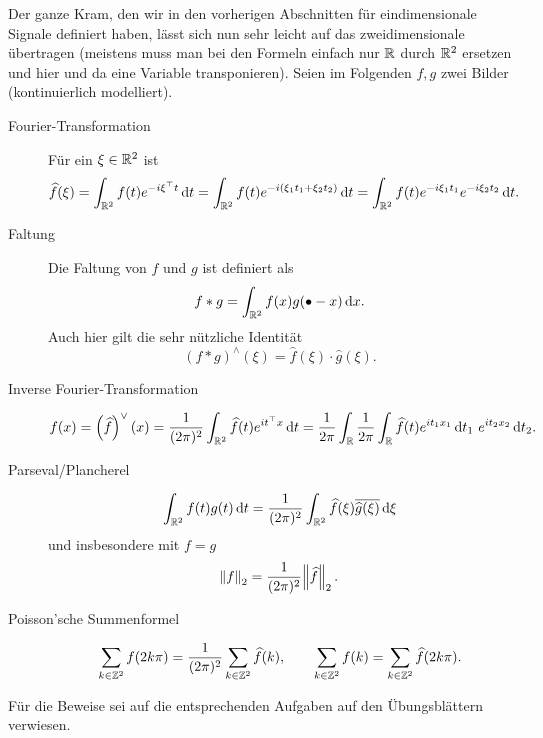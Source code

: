 \begin{remark}
Der ganze Kram, den wir in den vorherigen Abschnitten für eindimensionale Signale definiert haben,
lässt sich nun sehr leicht auf das zweidimensionale übertragen (meistens muss man bei den Formeln
einfach nur $ \mathbb{R} $ durch $ \mathbb{R}^{2} $ ersetzen und hier und da eine Variable transponieren). Seien im 
Folgenden $ f, g $ zwei Bilder (kontinuierlich modelliert).
\begin{description}
\item [Fourier-Transformation] 
  Für ein $ \xi \in \mathbb{R}^{2} $ ist
  \[
      \widehat{f}(\xi) 
    = \int_{\R^{2}} f(t) e^{-i \xi^{\top} t} \dif t
    = \int_{\R^{2}} f(t) e^{-i (\xi_{1}t_{1} + \xi_{2}t_{2})} \dif t
    = \int_{\R^{2}} f(t) e^{-i\xi_{1}t_{1}} e^{-i\xi_{2}t_{2}} \dif t.
  \]
\item [Faltung]
  Die Faltung von $ f $ und $ g $ ist definiert als
  \[
    f * g = \int_{\R^{2}} f(x) g(\bullet - x) \dif x.
  \]
  Auch hier gilt die sehr nützliche Identität
  \[
    (f * g)^{\wedge}(\xi) = \widehat{f}(\xi) \cdot \widehat{g}(\xi).
  \]
\item [Inverse Fourier-Transformation]
  \[
      f(x) 
    = \left( \widehat{f} \right)^{\vee}(x)
    = \frac{1}{(2\pi)^{2}} \int_{\R^{2}} \widehat{f}(t) e^{it^{\top}x} \dif t
    = \frac{1}{2\pi} \int_{\R} \frac{1}{2\pi} \int_{\R} 
        \widehat{f}(t) e^{it_{1}x_{1}} \dif t_{1} \ e^{it_{2}x_{2}} \dif t_{2}.
  \]
\item [Parseval/Plancherel]
\[
    \int_{\R^{2}} f(t)g(t) \dif t
  = \frac{1}{(2\pi)^{2}} \int_{\R^{2}} \widehat{f}(\xi) \overline{\widehat{g}(\xi)} \dif \xi
\]
und insbesondere mit $ f = g $
\[
  \norm{f}_{2} = \frac{1}{(2\pi)^{2}} \norm{\widehat{f}}_{2}.
\]
\item [Poisson'sche Summenformel]
\[
    \sum_{k \in \mathbb{Z}^{2}} f(2k\pi)
  = \frac{1}{(2\pi)^{2}} \sum_{k \in \mathbb{Z}^{2}} \widehat{f}(k), \qquad
    \sum_{k \in \mathbb{Z}^{2}} f(k)
  = \sum_{k \in \mathbb{Z}^{2}} \widehat{f}(2k\pi).
\]
\end{description}
Für die Beweise sei auf die entsprechenden Aufgaben auf den Übungsblättern verwiesen.
\end{remark}

\begin{remark}
\end{remark}